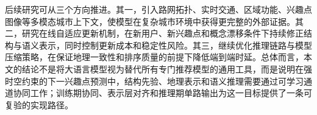 后续研究可从三个方向推进。其一，引入路网拓扑、实时交通、区域功能、兴趣点图像等多模态城市上下文，使模型在复杂城市环境中获得更完整的外部证据。其二，研究在线自适应更新机制，在新用户、新兴趣点和概念漂移条件下持续修正结构与语义表示，同时控制更新成本和稳定性风险。其三，继续优化推理链路与模型压缩策略，在保证地理一致性和排序质量的前提下降低端到端时延。总体而言，本文的结论不是将大语言模型视为替代所有专门推荐模型的通用工具，而是说明在强时空约束的下一兴趣点预测中，结构先验、地理表示和语义推理需要通过可学习通道协同工作；训练期协同、表示层对齐和推理期单路输出为这一目标提供了一条可复验的实现路径。

\pagestyle{thesisnormal}
